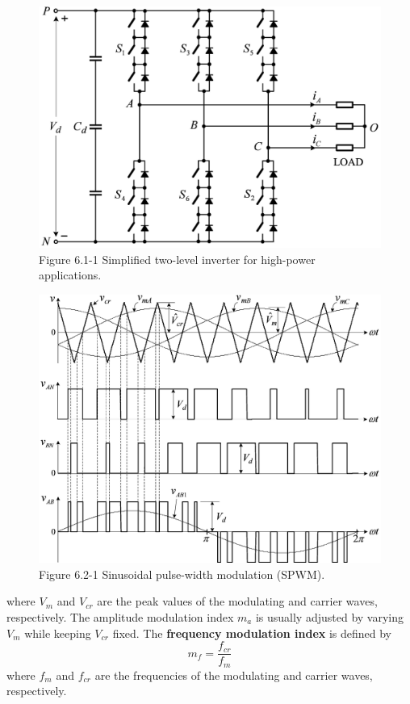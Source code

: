 \documentclass[letterpaper,12pt]{article}
\begin{document}
\begin{figure}[h]
	\centering
	\includegraphics[width=0.5\textheight]{graficos/img61.jpg}
	\caption{Figure 6.1-1 Simplified two-level inverter for high-power applications.}
\end{figure}
\FloatBarrier

\begin{figure}[h]
	\centering
	\includegraphics[width=0.5\textheight]{graficos/img62.jpg}
	\caption{Figure 6.2-1 Sinusoidal pulse-width modulation (SPWM).}
\end{figure}
\FloatBarrier

where $V_m$ and $V_{cr}$ are the peak values of the modulating and carrier waves, respectively. The amplitude modulation index $m_a$ is usually adjusted by varying $V_m$ while keeping $V_{cr}$ fixed. The \textbf{frequency modulation index} is defined by
\[
	m_f = \frac{f_{cr}}{f_m}
\]
where $f_m$ and $f_{cr}$ are the frequencies of the modulating and carrier waves, respectively.
\end{document}
